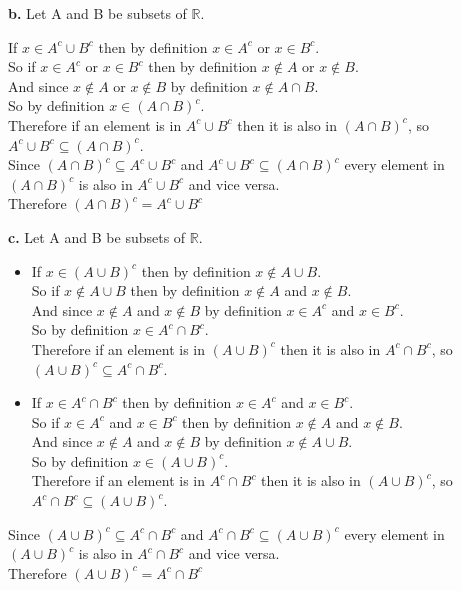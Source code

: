 \documentclass{article}
\begin{document}
{\Large \textbf{b.}} Let A and B be subsets of $\mathbb{R}$.
\begin{center}
    \doublespacing
    If $x\in A^c\cup B^c$ then by definition $x\in A^c$ or $x\in B^c$.
    \\So if $x\in A^c$ or $x\in B^c$ then by definition $x\notin A$ or $x\notin B$.
    \\And since $x\notin A$ or $x\notin B$ by definition $x\notin A\cap B$.
    \\So by definition $x\in (A\cap B)^c$.
    \\Therefore if an element is in $A^c\cup B^c$ then it is also in $(A\cap B)^c$, so $A^c\cup B^c\subseteq (A\cap B)^c$. \qedsymbol
    \\Since $(A\cap B)^c\subseteq A^c\cup B^c$ and $A^c\cup B^c\subseteq (A\cap B)^c$ every element in $(A\cap B)^c$ is also in $A^c\cup B^c$ and vice versa.
    \\Therefore $(A\cap B)^c = A^c\cup B^c$
\end{center}

{\Large \textbf{c.}} Let A and B be subsets of $\mathbb{R}$.
\begin{center}
    \doublespacing
    \begin{itemize}
        \item If $x\in (A\cup B)^c$ then by definition $x\notin A\cup B$.
        \\So if $x\notin A\cup B$ then by definition $x\notin A$ and $x\notin B$.
        \\And since $x\notin A$ and $x\notin B$ by definition $x\in A^c$ and $x\in B^c$.
        \\So by definition $x\in A^c\cap B^c$.
        \\Therefore if an element is in $(A\cup B)^c$ then it is also in $A^c\cap B^c$, so $(A\cup B)^c\subseteq A^c\cap B^c$.
        \item If $x\in A^c\cap B^c$ then by definition $x\in A^c$ and $x\in B^c$.
        \\So if $x\in A^c$ and $x\in B^c$ then by definition $x\notin A$ and $x\notin B$.
        \\And since $x\notin A$ and $x\notin B$ by definition $x\notin A\cup B$.
        \\So by definition $x\in (A\cup B)^c$.
        \\Therefore if an element is in $A^c\cap B^c$ then it is also in $(A\cup B)^c$, so $A^c\cap B^c\subseteq (A\cup B)^c$.
    \end{itemize}
    Since $(A\cup B)^c\subseteq A^c\cap B^c$ and $A^c\cap B^c\subseteq (A\cup B)^c$ every element in $(A\cup B)^c$ is also in $A^c\cap B^c$ and vice versa.
    \\Therefore $(A\cup B)^c = A^c\cap B^c$ \qedsymbol
\end{center}
\end{document}
